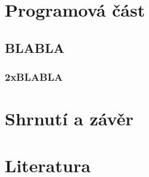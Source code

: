 \documentclass[12pt,oneside]{book} %
\begin{document}
\part{Programová část}\label{program}

\chapter{BLABLA}\label{BLABLA}
\section{2xBLABLA}\label{2xBLABLA}

\part{Shrnutí a závěr}\label{shrnuti}

\part{Literatura}\label{literatura}
\end{document}
